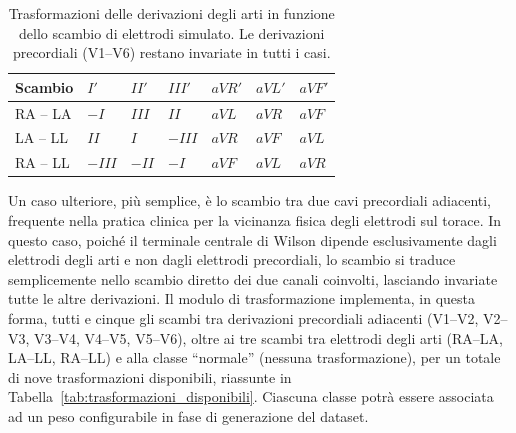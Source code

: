 \begin{table}[htbp!]
	\centering
	\caption{Trasformazioni delle derivazioni degli arti in funzione dello scambio di elettrodi simulato. Le derivazioni precordiali (V1--V6) restano invariate in tutti i casi.}
	\label{tab:trasformazioni_scambio}
	\begin{tabular}{@{}lllllll@{}}
		\toprule
		\textbf{Scambio} & $I'$ & $II'$ & $III'$ & $aVR'$ & $aVL'$ & $aVF'$ \\
		\midrule
		RA -- LA & $-I$   & $III$  & $II$   & $aVL$ & $aVR$ & $aVF$ \\
		LA -- LL & $II$   & $I$    & $-III$ & $aVR$ & $aVF$ & $aVL$ \\
		RA -- LL & $-III$ & $-II$  & $-I$   & $aVF$ & $aVL$ & $aVR$ \\
		\bottomrule
	\end{tabular}
\end{table}

Un caso ulteriore, più semplice, è lo scambio tra due cavi precordiali adiacenti, frequente nella pratica clinica per la vicinanza fisica degli elettrodi sul torace. In questo caso, poiché il terminale centrale di Wilson dipende esclusivamente dagli elettrodi degli arti e non dagli elettrodi precordiali, lo scambio si traduce semplicemente nello scambio diretto dei due canali coinvolti, lasciando invariate tutte le altre derivazioni. Il modulo di trasformazione implementa, in questa forma, tutti e cinque gli scambi tra derivazioni precordiali adiacenti (V1--V2, V2--V3, V3--V4, V4--V5, V5--V6), oltre ai tre scambi tra elettrodi degli arti (RA--LA, LA--LL, RA--LL) e alla classe ``normale'' (nessuna trasformazione), per un totale di nove trasformazioni disponibili, riassunte in Tabella~\ref{tab:trasformazioni_disponibili}. Ciascuna classe potrà essere associata ad un peso configurabile in fase di generazione del dataset.

